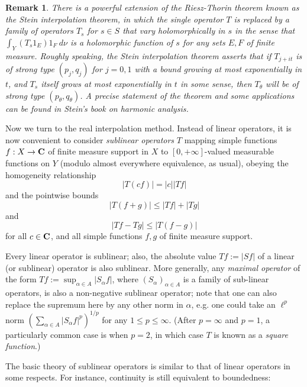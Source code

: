 \documentclass[10pt,reqno]{amsart}
\newtheorem{remark}[theorem]{Remark}
\begin{document}
\begin{remark}
    There is a powerful extension of the Riesz-Thorin theorem known as the \emph{Stein interpolation theorem}, in which the single operator $T$ is replaced by a family of operators $T_s$ for $s \in S$ that vary holomorphically in $s$ in the sense that $\int_Y (T_s 1_E) 1_F\ d\nu$ is a holomorphic function of $s$ for any sets $E, F$ of finite measure. Roughly speaking, the Stein interpolation theorem asserts that if $T_{j+it}$ is of strong type $(p_j,q_j)$ for $j=0,1$ with a bound growing at most exponentially in $t$, and $T_s$ itself grows at most exponentially in $t$ in some sense, then $T_\theta$ will be of strong type $(p_\theta,q_\theta)$. A precise statement of the theorem and some applications can be found in \emph{Stein’s book on harmonic analysis}. 
\end{remark}

Now we turn to the real interpolation method. Instead of linear operators, it is now convenient to consider \emph{sublinear operators} $T$ mapping simple functions $f: X \rightarrow {\bf C}$ of finite measure support in $X$ to $[0,+\infty]$-valued measurable functions on $Y$ (modulo almost everywhere equivalence, as usual), obeying the homogeneity relationship
%
\[ |T( cf )| = |c| |Tf|\]
%
and the pointwise bounds
%
\[ |T(f + g)| \leq |Tf| + |Tg|\]
%
and
%
\[ |Tf - Tg| \leq |T(f-g)|\]
%
for all $c \in {\bf C}$, and all simple functions $f, g$ of finite measure support.

Every linear operator is sublinear; also, the absolute value $Tf := |Sf|$ of a linear (or sublinear) operator is also sublinear. More generally, any \emph{maximal operator} of the form $T f := \sup_{\alpha \in A} |S_\alpha f|$, where $(S_\alpha)_{\alpha \in A}$ is a family of sub-linear operators, is also a non-negative sublinear operator; note that one can also replace the supremum here by any other norm in $\alpha$, e.g. one could take an $\ell^p$ norm $(\sum_{\alpha \in A} |S_\alpha f|^p)^{1/p}$ for any $1 \leq p \leq \infty$. (After $p=\infty$ and $p=1$, a particularly common case is when $p=2$, in which case $T$ is known as a \emph{square function}.)

The basic theory of sublinear operators is similar to that of linear operators in some respects. For instance, continuity is still equivalent to boundedness:
\end{document}
